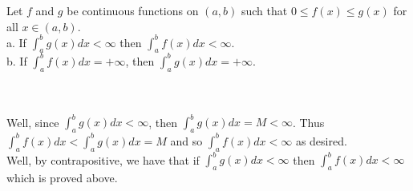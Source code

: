 Let $f$ and $g$ be continuous functions on $(a,b)$ such that $0\leq f(x)\leq g(x)$ for all $x\in(a,b)$.\\

a. If $\int_a^bg(x)dx<\infty$ then $\int_a^bf(x)dx<\infty$.\\

b. If $\int_a^bf(x)dx=+\infty$, then $\int_a^bg(x)dx=+\infty$.\\\\

\begin{solution}\renewcommand{\qedsymbol}{}\ \\
    Well, since $\int_a^bg(x)dx<\infty$, then $\int_a^bg(x)dx=M<\infty$. Thus
    $\int_a^bf(x)dx<\int_a^bg(x)dx=M$ and so $\int_a^bf(x)dx<\infty$ as desired.\\

    Well, by contrapositive, we have that if $\int_a^bg(x)dx<\infty$ then $\int_a^bf(x)dx<\infty$ which
    is proved above.

\end{solution}